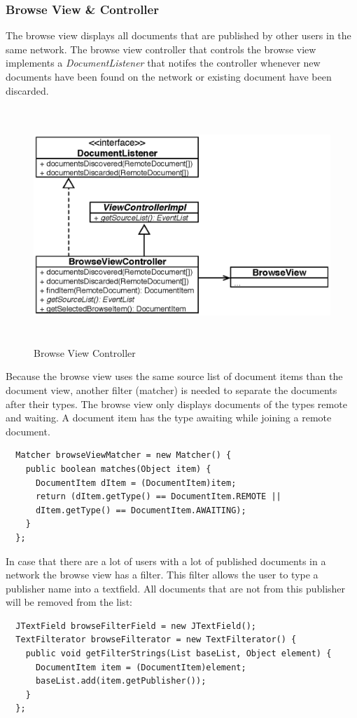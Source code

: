 \subsubsection{Browse View \& Controller}
The browse view displays all documents that are published by other users in the same network. The browse view controller that controls the browse view implements a \textit{DocumentListener} that notifes the controller whenever new documents have been found on the network or existing document have been discarded.
\begin{figure}[H]
\begin{center}
  \includegraphics[height=3.5in, width=5.62in]{../images/finalreport/application_browseview.eps}
\caption{Browse View Controller}
\label{application_browseview}
\end{center}
\end{figure}

Because the browse view uses the same source list of document items than the document view, another filter (matcher) is needed to separate the documents after their types. The browse view only displays documents of the types remote and waiting. A document item has the type awaiting while joining a remote document.
\begin{verbatim}
  Matcher browseViewMatcher = new Matcher() {
    public boolean matches(Object item) {
      DocumentItem dItem = (DocumentItem)item;
      return (dItem.getType() == DocumentItem.REMOTE ||
      dItem.getType() == DocumentItem.AWAITING);
    }
  };
\end{verbatim}
In case that there are a lot of users with a lot of published documents in a network the browse view has a filter. This filter allows the user to type a publisher name into a textfield. All documents that are not from this publisher will be removed from the list:
\begin{verbatim}
  JTextField browseFilterField = new JTextField();
  TextFilterator browseFilterator = new TextFilterator() {
    public void getFilterStrings(List baseList, Object element) {
      DocumentItem item = (DocumentItem)element;
      baseList.add(item.getPublisher());
    }
  };
\end{verbatim}

